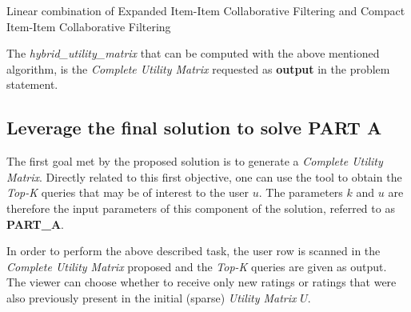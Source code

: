\begin{algorithm}
\caption{Linear combination of Expanded Item-Item Collaborative Filtering and Compact Item-Item Collaborative Filtering}
\label{alg:hybrid}


\end{algorithm}

The \textit{hybrid\_utility\_matrix} that can be computed with the above mentioned algorithm, is the \textit{Complete Utility Matrix} requested as \textbf{output} in the problem statement.


\subsection{Leverage the final solution to solve PART A}

The first goal met by the proposed solution is to generate a \textit{Complete Utility Matrix}. Directly related to this first objective, one can use the tool to obtain the \textit{Top-K} queries that may be of interest to the user $u$. The parameters $k$ and $u$ are therefore the input parameters of this component of the solution, referred to as \textbf{PART\_A}.

In order to perform the above described task, the user row is scanned in the \textit{Complete Utility Matrix} proposed and the \textit{Top-K} queries are given as output. The viewer can choose whether to receive only new ratings or ratings that were also previously present in the initial (sparse) \textit{Utility Matrix} $U$.



